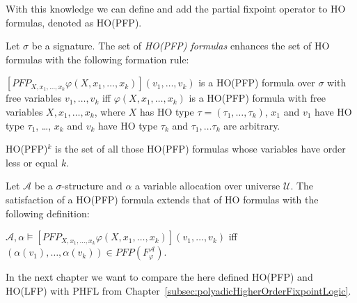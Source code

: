 With this knowledge we can define and add the partial fixpoint operator to HO formulas, denoted as HO(PFP).

\begin{definition}
    Let $\sigma$ be a signature. The set of \emph{HO(PFP) formulas} enhances the set of HO formulas with the
    following formation rule:
    \begin{compactitem}
        \item $[PFP_{X, x_1, \dots, x_k}\varphi(X, x_1, \dots, x_k)](v_1, \dots, v_k)$ is a HO(PFP) formula over
        $\sigma$ with free variables $v_1, \dots, v_k$ iff $\varphi(X, x_1, \dots, x_k)$ is a HO(PFP) formula with
        free variables $X, x_1, \dots, x_k$, where $X$ has HO type $\tau = (\tau_1, \dots, \tau_k)$, $x_1$ and $v_1$
        have HO type $\tau_1$, \dots, $x_k$ and $v_k$ have HO type $\tau_k$ and $\tau_1, \dots \tau_k$ are arbitrary.
    \end{compactitem}
\end{definition}

HO(PFP)$^k$ is the set of all those HO(PFP) formulas whose variables have order less or equal $k$.

\begin{definition}
    Let $\mathcal{A}$ be a $\sigma$-structure and $\alpha$ a variable allocation over universe $\mathcal{U}$. The
    satisfaction of a HO(PFP) formula extends that of HO formulas with the following definition:
    \begin{compactitem}
        \item $\mathcal{A}, \alpha \models [PFP_{X, x_1, \dots, x_k}\varphi(X, x_1, \dots, x_k)](v_1, \dots, v_k)$
        iff $(\alpha(v_1), \dots, \alpha(v_k)) \in PFP(F_\varphi^\mathcal{A})$.
    \end{compactitem}
\end{definition}

In the next chapter we want to compare the here defined HO(PFP) and HO(LFP) with PHFL from
Chapter~\ref{subsec:polyadicHigherOrderFixpointLogic}.
